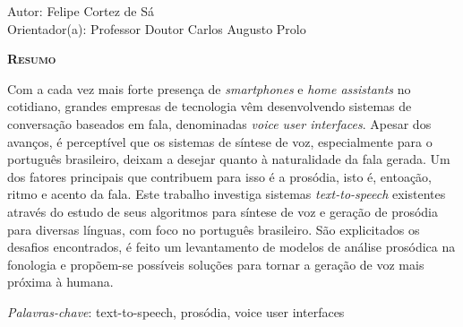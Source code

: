 \begin{center}
	{\Large{\textbf{\tccTitle}}}
\end{center}

\vspace{1cm}

\begin{flushright}
	Autor: Felipe Cortez de Sá \\
	Orientador(a): Professor Doutor Carlos Augusto Prolo
\end{flushright}

\vspace{1cm}

\begin{center}
	\Large{\textsc{\textbf{Resumo}}}
\end{center}

\noindent Com a cada vez mais forte presença de \emph{smartphones} e \emph{home
assistants} no cotidiano, grandes empresas de tecnologia vêm desenvolvendo
sistemas de conversação baseados em fala, denominadas \emph{voice user interfaces}.
Apesar dos avanços, é perceptível que os sistemas de síntese de voz,
especialmente para o português brasileiro, deixam a desejar quanto à
naturalidade da fala gerada. Um dos fatores principais que contribuem para isso
é a prosódia, isto é, entoação, ritmo e acento da fala. Este trabalho investiga
sistemas \emph{text-to-speech} existentes através do estudo de seus algoritmos para
síntese de voz e geração de prosódia para diversas línguas, com foco no
português brasileiro. São explicitados os desafios encontrados, é feito um
levantamento de modelos de análise prosódica na fonologia e propõem-se
possíveis soluções para tornar a geração de voz mais próxima à humana.

\noindent\textit{Palavras-chave}: text-to-speech, prosódia, voice user interfaces
